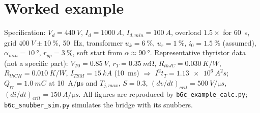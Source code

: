 \documentclass[10pt,a4paper]{scrartcl}
\newcommand{\Vd}{V_{d}}
\newcommand{\Id}{I_{d}}
\newcommand{\uk}{u_{k}}
\newcommand{\ur}{u_{r}}
\newcommand{\ITSM}{I_{TSM}}
\newcommand{\iit}{I^{2}t}
\begin{document}
\section{Worked example}
Specification: $\Vd = \SI{440}{V}$, $\Id = \SI{1000}{A}$, $I_{d,min} = \SI{100}{A}$, overload $1.5\times$ for \SI{60}{s}, grid $\SI{400}{V}\pm\SI{10}{\percent}$, \SI{50}{Hz}, transformer $\uk = \SI{6}{\percent}$, $\ur = \SI{1}{\percent}$, $i_0 = \SI{1.5}{\percent}$ (assumed), $\alpha_{min} = \SI{10}{\degree}$, $r_{pp} = \SI{3}{\percent}$, soft start from $\alpha\approx\SI{90}{\degree}$. Representative thyristor data (not a specific part): $V_{T0} = \SI{0.85}{V}$, $r_T = \SI{0.35}{m\ohm}$, $R_{thJC} = \SI{0.030}{K/W}$, $R_{thCH} = \SI{0.010}{K/W}$, $\ITSM = \SI{15}{kA}$ (\SI{10}{ms}) $\Rightarrow$ $\iit_T = \SI{1.13e6}{A^2 s}$; $Q_{rr} = \SI{1.0}{mC}$ at \SI{10}{A/\micro s} and $T_{j,max}$, $S = 0.3$, $(dv/dt)_{crit} = \SI{500}{V/\micro s}$, $(di/dt)_{crit} = \SI{150}{A/\micro s}$. All figures are reproduced by \texttt{b6c\_example\_calc.py}; \texttt{b6c\_snubber\_sim.py} simulates the bridge with its snubbers.
\end{document}
